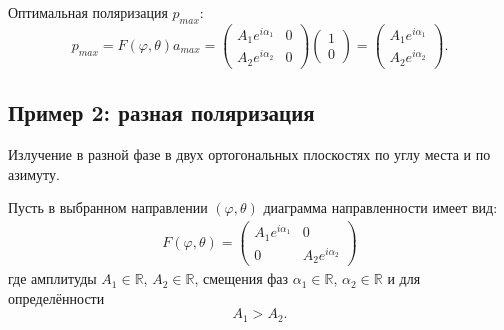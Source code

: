 Оптимальная поляризация $p_{max}$:
\[
    p_{max}
    = F(\varphi, \theta) a_{max}
    = \begin{pmatrix}
        A_1 e^{i \alpha_1} & 0 \\
        A_2 e^{i \alpha_2} & 0
    \end{pmatrix}
    \begin{pmatrix}
        1 \\
        0
    \end{pmatrix}
    = \begin{pmatrix}
        A_1 e^{i \alpha_1} \\
        A_2 e^{i \alpha_2}
    \end{pmatrix} .
\]

\subsection{Пример 2: разная поляризация}

Излучение в разной фазе в двух ортогональных плоскостях по углу места и по азимуту.

Пусть в выбранном направлении $(\varphi, \theta)$ диаграмма направленности имеет вид:
\begin{gather*}
    F(\varphi, \theta) = \begin{pmatrix}
        A_1 e^{i \alpha_1} & 0                  \\
        0                  & A_2 e^{i \alpha_2}
    \end{pmatrix}
\end{gather*}
где амплитуды $A_1 \in \mathbb{R}$, $A_2 \in \mathbb{R}$, смещения фаз $\alpha_1 \in \mathbb{R}$, $\alpha_2 \in \mathbb{R}$ и для определённости
\[
    A_1 > A_2 .
\]


